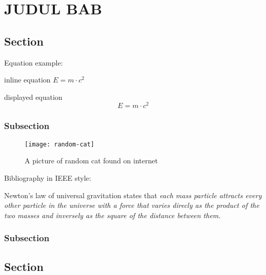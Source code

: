\chapter{JUDUL BAB}
\section{Section}
\lipsum[1]
Equation example:

inline equation $E=m\cdot c^2$

displayed equation
\begin{equation}
    E=m\cdot c^2
\end{equation}
\subsection{Subsection}
\begin{figure}[H]
    \centering
    \texttt{[image: random-cat]}
    \caption{A picture of random cat found on internet}\label{random-cat}
\end{figure}

Bibliography in IEEE style:

Newton's law of universal gravitation states that \textit{each mass particle attracts every other particle in the universe with a force that varies direcly as the product of the two masses and inversely as the square of the distance between them.}\cite{book:classical}

\lipsum[1]
\subsection{Subsection}
\lipsum[1]
\section{Section}
\lipsum[2]
